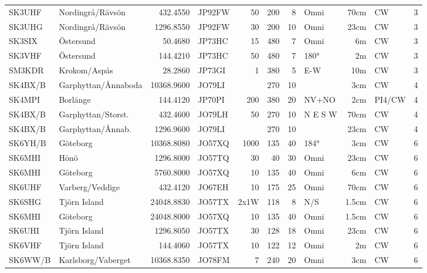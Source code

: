 \begin{longtable}{llrlrrrlrll}
	SK3UHF   & Nordingrå/Rävsön    &   432.4550 & JP92FW &   50 &  200 &    8 & Omni    &  70cm & CW     & 3    \\
	SK3UHG   & Nordingrå/Rävsön    &  1296.8550 & JP92FW &   30 &  200 &   10 & Omni    &  23cm & CW     & 3    \\
	SK3SIX   & Östersund           &    50.4680 & JP73HC &   15 &  480 &    7 & Omni    &    6m & CW     & 3    \\
	SK3VHF   & Östersund           &   144.4210 & JP73HC &   50 &  480 &    7 & 180°    &    2m & CW     & 3    \\
	SM3KDR   & Krokom/Aspås        &    28.2860 & JP73GI &    1 &  380 &    5 & E-W     &   10m & CW     & 3    \\
	SK4BX/B  & Garphyttan/Ånnaboda & 10368.9600 & JO79LI &      &  270 &   10 &         &   3cm & CW     & 4    \\
	SK4MPI   & Borlänge            &   144.4120 & JP70PI &  200 &  380 &   20 & NV+NO   &   2cm & PI4/CW & 4    \\
	SK4BX/B  & Garphyttan/Storst.  &   432.4600 & JO79LH &   50 &  270 &   10 & N E S W &  70cm & CW     & 4    \\
	SK4BX/B  & Garphyttan/Ånnab.   &  1296.9600 & JO79LI &      &  270 &   10 &         &  23cm & CW     & 4    \\
	SK6YH/B  & Göteborg            & 10368.8080 & JO57XQ & 1000 &  135 &   40 & 184°    &   3cm & CW     & 6    \\
	SK6MHI   & Hönö                &  1296.8000 & JO57TQ &   30 &   40 &   30 & Omni    &  23cm & CW     & 6    \\
	SK6MHI   & Göteborg            &  5760.8000 & JO57XQ &   10 &  135 &   40 & Omni    &   6cm & CW     & 6    \\
	SK6UHF   & Varberg/Veddige     &   432.4120 & JO67EH &   10 &  175 &   25 & Omni    &  70cm & CW     & 6    \\
	SK6SHG   & Tjörn Island        & 24048.8830 & JO57TX & 2x1W &  118 &    8 & N/S     & 1.5cm & CW     & 6    \\
	SK6MHI   & Göteborg            & 24048.8000 & JO57XQ &   10 &  135 &   40 & Omni    & 1.5cm & CW     & 6    \\
	SK6UHI   & Tjörn Island        &  1296.8050 & JO57TX &   30 &  128 &   18 & Omni    &  23cm & CW     & 6    \\
	SK6VHF   & Tjörn Island        &   144.4060 & JO57TX &   10 &  122 &   12 & Omni    &    2m & CW     & 6    \\
	SK6WW/B  & Karlsborg/Vaberget  & 10368.8350 & JO78FM &    7 &  240 &   20 & Omni    &   3cm & CW     & 6    \\

\end{longtable}
